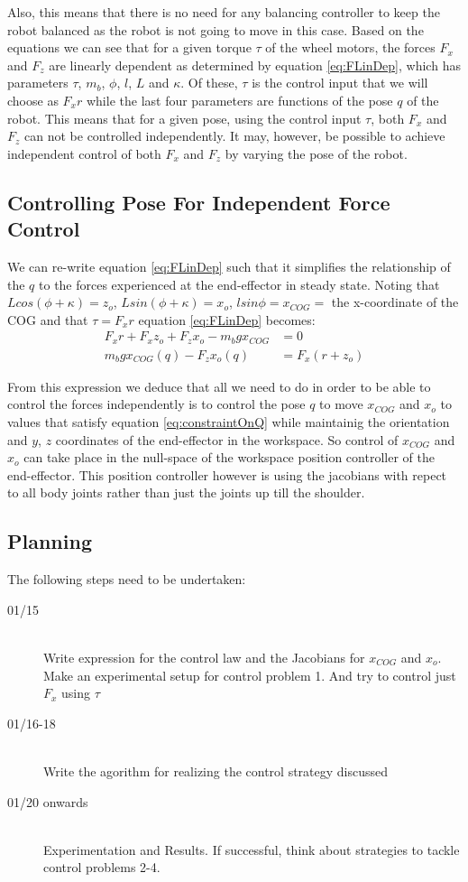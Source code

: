 \documentclass[a4paper,10pt]{article}
\begin{document}
Also, this means that there is no need for any balancing controller to keep the robot balanced as the robot is not
going to move in this case. Based on the equations we can see that for a given torque $\tau$ of the wheel motors, 
the forces $F_x$ and $F_z$ are linearly dependent as determined by equation \ref{eq:FLinDep}, which has parameters
$\tau$, $m_b$, $\phi$, $l$, $L$ and $\kappa$. Of these, $\tau$ is the control input that we will choose as 
$F_xr$ while the last four parameters are functions of the pose $q$ of the robot. This means that for a given pose,
using the control input $\tau$, both $F_x$ and $F_z$ can not be controlled independently. It may, however, be possible to achieve 
independent control of both $F_x$ and $F_z$ by varying the pose of the robot.

\subsection{Controlling Pose For Independent Force Control}

We can re-write equation \ref{eq:FLinDep} such that it simplifies the relationship of the $q$ to
the forces experienced at the end-effector in steady state. Noting that $Lcos(\phi+\kappa) = z_o$,
$Lsin(\phi+\kappa) = x_o$, $lsin\phi = x_{COG} = $ the x-coordinate of the COG and that $\tau = F_xr$
equation \ref{eq:FLinDep} becomes:
\begin{align}
 F_xr + F_xz_o + F_zx_o - m_bgx_{COG} &= 0 \nonumber \\
 m_bgx_{COG}(q) - F_zx_o(q) &= F_x (r + z_o) \label{eq:constraintOnQ}
\end{align}

From this expression we deduce that all we need to do in order to be able to control the forces
independently is to control the pose $q$ to move $x_{COG}$ and $x_o$ to values that satisfy equation
\ref{eq:constraintOnQ} while maintainig the orientation and $y$, $z$ coordinates of the end-effector
in the workspace. So control of $x_{COG}$ and $x_o$ can take place in the null-space of the
workspace position controller of the end-effector. This position controller however is using
the jacobians with repect to all body joints rather than just the joints up till the shoulder.

\subsection{Planning}
The following steps need to be undertaken:
\begin{description}
 \item[01/15] \hfill \\
 Write expression for the control law and the Jacobians for $x_{COG}$ and $x_o$. Make an experimental
 setup for control problem 1. And try to control just $F_x$ using $\tau$
 \item[01/16-18] \hfill \\
 Write the agorithm for realizing the control strategy discussed
 \item[01/20 onwards] \hfill \\
 Experimentation and Results. If successful, think about strategies to tackle control problems 2-4.
\end{description}
\end{document}
